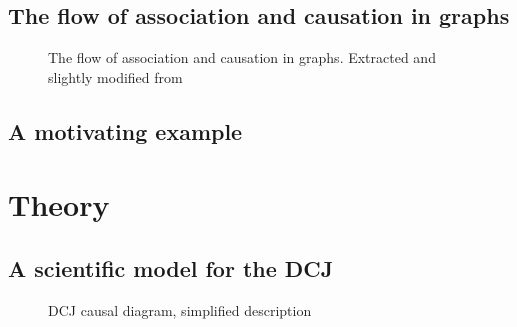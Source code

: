 \documentclass[
  authoryear,
  preprint,
  1p]{elsarticle}
\begin{document}
\subsection{The flow of association and causation in
graphs}\label{sec-framework-flow}

\begin{figure}


\caption{\label{fig-ACflow}The flow of association and causation in
graphs. Extracted and slightly modified from \citet[31]{Neal_2020}}

\end{figure}%

\subsection{A motivating example}\label{sec-framework-example}

\section{Theory}\label{sec-theory}

\subsection{A scientific model for the DCJ}\label{sec-theory-scientific}

\begin{figure}


\caption{\label{fig-SciModel_simp1}DCJ causal diagram, simplified
description}

\end{figure}%
\end{document}
